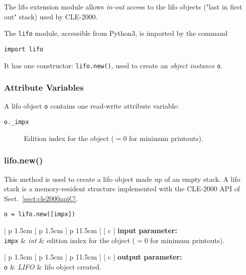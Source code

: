 The {\sc lifo} extension module allows {\sl in-out} access to the {\sc lifo} objects ("last in first out" stack) used by CLE-2000.

The {\tt lifo} module, accessible from Python3, is imported by the command
\begin{verbatim}
import lifo
\end{verbatim}
It has one constructor: {\tt lifo.new()}, used to create an {\sl object instance} {\tt o}.

\subsubsection{Attribute Variables }

A {\sc lifo} object {\tt o} contains one read-write attribute variable:

\begin {description}
\item [{\tt o.\_impx}] Edition index for the object ($=0$ for minimum printouts).
\end {description}

\subsubsection{lifo.new()}

This method is used to create a {\sc lifo} object made up of an empty stack. A {\sc lifo} stack is a memory-resident structure
implemented with the CLE-2000 API of Sect.~\ref{sect:cle2000apiC}. 

\begin{verbatim}
o = lifo.new([impx])
\end{verbatim}

\noindent
\begin{tabular} {| p {1.5cm} | p {1.5cm} | p {11.5cm} |}
\hline
{} {| c |} {\bf input parameter:} \\
\hline
{\tt impx} & {\it int}  & edition index for the object ($=0$ for minimum printouts). \\
\hline
\end{tabular}

\vskip 0.8cm

\noindent
\begin{tabular} {| p {1.5cm} | p {1.5cm} | p {11.5cm} |}
\hline
{} {| c |} {\bf output parameter:} \\
\hline
{\tt o} & {\it LIFO} & {\sc lifo} object created. \\
\hline
\end{tabular}

